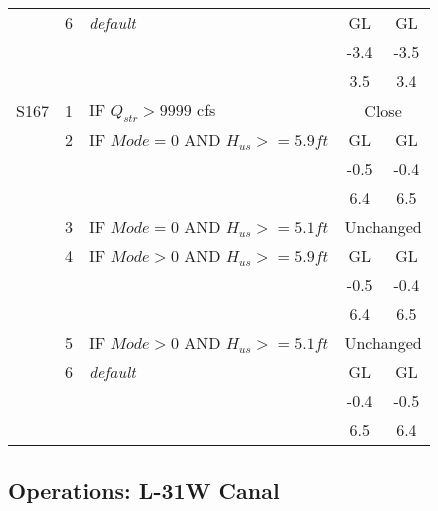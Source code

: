 \begin{table}[!h]
\begin{tabular}{|l|c|l|c|c|}
\hline
              &  6  & \it{default}                                       & GL    & GL    \\
              &     &                                                    & -3.4  & -3.5 \\
              &     &                                                    & 3.5   & 3.4  \\
\hline
\hline
S167          &  1  & IF $Q_{str}>9999$ cfs                              & \multicolumn{2}{|c|}{Close}   \\
\hline
              &  2  & IF $Mode=0$ AND $H_{us}>=5.9 ft$                   & GL    & GL   \\
              &     &                                                    & -0.5  & -0.4 \\
              &     &                                                    & 6.4   & 6.5  \\
\hline
              &  3  & IF $Mode=0$ AND $H_{us}>=5.1ft$                    & \multicolumn{2}{|c|}{Unchanged}   \\
\hline
              &  4  & IF $Mode>0$ AND $H_{us}>=5.9 ft$                   & GL    & GL   \\
              &     &                                                    & -0.5  & -0.4 \\
              &     &                                                    & 6.4   & 6.5  \\
\hline
              &  5  & IF $Mode>0$ AND $H_{us}>=5.1ft$                   & \multicolumn{2}{|c|}{Unchanged}   \\
\hline
              &  6  & \it{default}                                       & GL    & GL    \\
              &     &                                                    & -0.4  & -0.5 \\
              &     &                                                    & 6.5   & 6.4  \\
\hline
\hline
\end{tabular}
\end{table}
\normalsize


\clearpage
\subsection{Operations: L-31W Canal}

